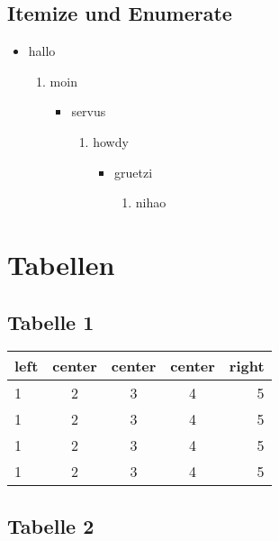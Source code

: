 \documentclass{article}
\begin{document}
\subsection{Itemize und Enumerate}

\begin{itemize}
    \item hallo
    \begin{enumerate}
        \item moin
        \begin{itemize}
            \item servus
            \begin{enumerate}
                \item howdy
                \begin{itemize}
                    \item gruetzi
                    \begin{enumerate}
                        \item nihao
                    \end{enumerate}
                \end{itemize}
            \end{enumerate}
        \end{itemize}
    \end{enumerate}
\end{itemize}

\clearpage

\section{Tabellen}

\subsection{Tabelle 1}

\begin{tabular}{l c c c r }
    left & center & center & center & right \\
    \hline
    1 & 2 & 3 & 4 & 5 \\
    1 & 2 & 3 & 4 & 5 \\
    1 & 2 & 3 & 4 & 5 \\
    1 & 2 & 3 & 4 & 5 \\
\end{tabular}

\subsection{Tabelle 2}
\end{document}
